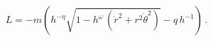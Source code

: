\begin{equation}
L = -  m \left( h^{-\eta} \sqrt{1 - h^\omega \, (\dot{r}^2 + r^2
\dot{\theta}^2)} - \hat{q} \, h^{-1} \right) \, .
\end{equation}

